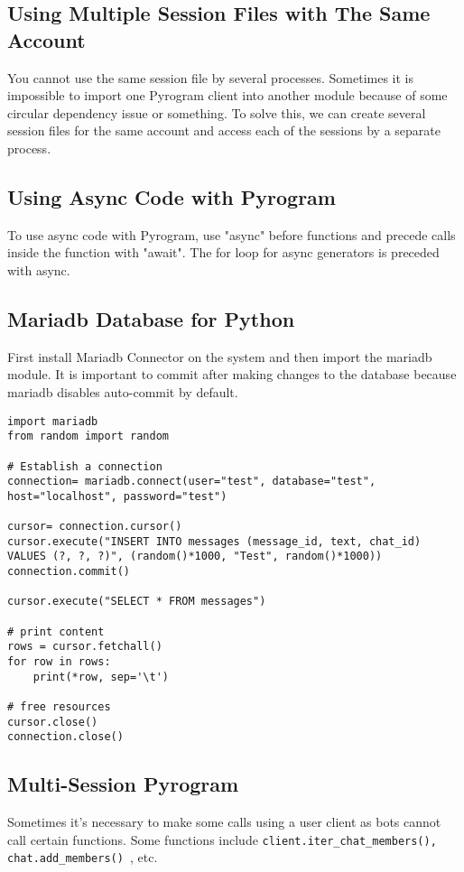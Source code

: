 \documentclass{article}
\begin{document}
\subsection{Using Multiple Session Files with The Same Account}
You cannot use the same session file by several processes. Sometimes it is impossible to import one Pyrogram client into another module because of some circular dependency issue or something. To solve this, we can create several session files for the same account and access each of the sessions by a separate process. 

\subsection{Using Async Code with Pyrogram}
To use async code with Pyrogram, use "async" before functions and precede calls inside the function with "await". The for loop for async generators is preceded with async. 

\subsection{Mariadb Database for Python}
First install Mariadb Connector on the system and then import the mariadb module.
It is important to commit after making changes to the database because mariadb disables auto-commit by default. 
\begin{lstlisting}
import mariadb
from random import random

# Establish a connection
connection= mariadb.connect(user="test", database="test", host="localhost", password="test")

cursor= connection.cursor()
cursor.execute("INSERT INTO messages (message_id, text, chat_id) VALUES (?, ?, ?)", (random()*1000, "Test", random()*1000))
connection.commit()

cursor.execute("SELECT * FROM messages")

# print content
rows = cursor.fetchall()
for row in rows:
    print(*row, sep='\t')

# free resources
cursor.close()
connection.close()

\end{lstlisting}

\subsection{Multi-Session Pyrogram}
Sometimes it's necessary to make some calls using a user client as bots cannot call certain functions. Some functions include \lstinline{client.iter_chat_members(), chat.add_members() }, etc. 
\end{document}
